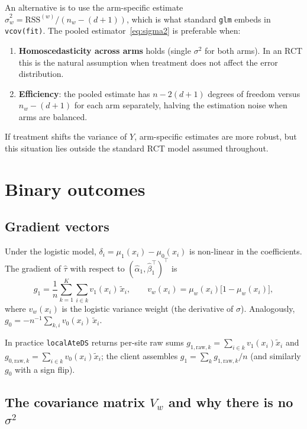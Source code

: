 \documentclass[11pt, a4paper]{article}
\newcommand{\xt}{\tilde{x}}
\newcommand{\hbeta}{\hat{\beta}}
\newcommand{\halpha}{\hat{\alpha}}
\newcommand{\htau}{\hat{\tau}}
\newcommand{\hsigma}{\hat{\sigma}}
\begin{document}
An alternative is to use the arm-specific estimate
$\hsigma_w^2 = \mathrm{RSS}^{(w)}/(n_w - (d+1))$,
which is what standard \texttt{glm} embeds in \texttt{vcov(fit)}.
The pooled estimator~\eqref{eq:sigma2} is preferable when:
\begin{enumerate}
  \item \textbf{Homoscedasticity across arms} holds (single $\sigma^2$ for both
        arms).  In an RCT this is the natural assumption when treatment does not
        affect the error distribution.
  \item \textbf{Efficiency}: the pooled estimate has $n - 2(d+1)$ degrees of
        freedom versus $n_w - (d+1)$ for each arm separately, halving the
        estimation noise when arms are balanced.
\end{enumerate}
If treatment shifts the variance of $Y$, arm-specific estimates are more robust,
but this situation lies outside the standard RCT model assumed throughout.

\section{Binary outcomes}\label{sec:bin}

\subsection{Gradient vectors}

Under the logistic model, $\delta_i = \mu_1(x_i) - \mu_0(x_i)$ is non-linear
in the coefficients.  The gradient of $\htau$ with respect to
$(\halpha_1,\hbeta_1^\top)^\top$ is
\begin{equation}
  g_1 = \frac{1}{n}\sum_{k=1}^K\sum_{i \in k} v_1(x_i)\,\xt_i,
  \qquad
  v_w(x_i) = \mu_w(x_i)\bigl[1 - \mu_w(x_i)\bigr],
\end{equation}
where $v_w(x_i)$ is the logistic variance weight (the derivative of $\sigma$).
Analogously, $g_0 = -n^{-1}\sum_{k,i} v_0(x_i)\,\xt_i$.

In practice \texttt{localAteDS} returns per-site raw sums
$g_{1,\text{raw},k} = \sum_{i \in k} v_1(x_i)\xt_i$ and
$g_{0,\text{raw},k} = \sum_{i \in k} v_0(x_i)\xt_i$;
the client assembles $g_1 = \sum_k g_{1,\text{raw},k}/n$ (and similarly $g_0$
with a sign flip).

\subsection{The covariance matrix $V_w$ and why there is no $\sigma^2$}
\end{document}
